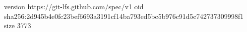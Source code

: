 version https://git-lfs.github.com/spec/v1
oid sha256:2d945b4e0fc23bef6693a3191cf14ba793ed5bc5b976c91d5c742737309998f1
size 3773
